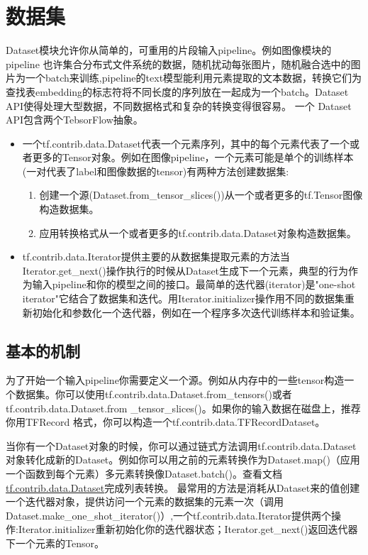 \section{数据集}
Dataset模块允许你从简单的，可重用的片段输入pipeline。例如图像模块的pipeline
也许集合分布式文件系统的数据，随机扰动每张图片，随机融合选中的图片为一个batch来训练,pipeline的text模型能利用元素提取的文本数据，转换它们为查找表embedding的标志符将不同长度的序列放在一起成为一个batch。Dataset API使得处理大型数据，不同数据格式和复杂的转换变得很容易。
一个 Dataset
 API包含两个TebsorFlow抽象。
\begin{itemize}
\item 一个tf.contrib.data.Dataset代表一个元素序列，其中的每个元素代表了一个或者更多的Tensor对象。例如在图像pipeline，一个元素可能是单个的训练样本(一对代表了label和图像数据的tensor)有两种方法创建数据集:
	\begin{enumerate}
		\item 创建一个源(Dataset.from\_tensor\_slices())从一个或者更多的tf.Tensor图像构造数据集。
		\item 应用转换格式从一个或者更多的tf.contrib.data.Dataset对象构造数据集。
	\end{enumerate}
	\item tf.contrib.data.Iterator提供主要的从数据集提取元素的方法当Iterator.get\_next()操作执行的时候从Dataset生成下一个元素，典型的行为作为输入pipeline和你的模型之间的接口。最简单的迭代器(iterator)是"one-shot iterator"它结合了数据集和迭代。用Iterator.initializer操作用不同的数据集重新初始化和参数化一个迭代器，例如在一个程序多次迭代训练样本和验证集。
\end{itemize}
\subsection{基本的机制}
为了开始一个输入pipeline你需要定义一个源。例如从内存中的一些tensor构造一个数据集。你可以使用tf.contrib.data.Dataset.from\_tensors()或者tf.contrib.data.Dataset.from
\newline \_tensor\_slices()。如果你的输入数据在磁盘上，推荐你用TFRecord
格式，你可以构造一个tf.contrib.data.TFRecordDataset。

当你有一个Dataset对象的时候，你可以通过链式方法调用tf.contrib.data.Dataset对象转化成新的Dataset。例如你可以用之前的元素转换作为Dataset.map()（应用一个函数到每个元素）多元素转换像Dataset.batch()。查看文档\href{https://www.tensorflow.org/api_docs/python/tf/contrib/data/Dataset}{tf.contrib.data.Dataset}完成列表转换。
最常用的方法是消耗从Dataset来的值创建一个迭代器对象，提供访问一个元素的数据集的元素一次（调用Dataset.make\_one\_shot\_iterator()）,一个tf.contrib.data.Iterator提供两个操作:Iterator.initializer重新初始化你的迭代器状态；Iterator.get\_next()返回迭代器下一个元素的Tensor。
